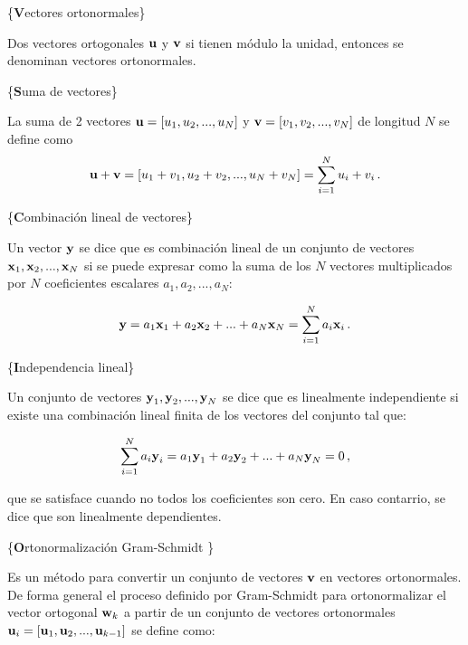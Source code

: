 \documentclass[
]{agujournal2019}
\begin{document}
\vspace{0.5cm}

\{\noindent \textbf Vectores ortonormales\}

Dos vectores ortogonales \({\textbf u}\) y \({\textbf v}\) si tienen
módulo la unidad, entonces se denominan vectores ortonormales.

\vspace{0.5cm} \{\noindent \textbf Suma de vectores\}

La suma de 2 vectores \({\textbf u}=[u_1,u_2,...,u_N]\) y
\({\textbf v}=[v_1,v_2,...,v_N]\) de longitud \(N\) se define como
\[{\textbf u} + {\textbf v}= [u_1 + v_1, u_2 + v_2,..., u_N + v_N]=\sum\limits^N_{i=1} u_i + v_i\,.\]

\vspace{0.5cm} \{\noindent \textbf Combinación lineal de vectores\}

Un vector \({\textbf y}\) se dice que es combinación lineal de un
conjunto de vectores \({\textbf x}_1, {\textbf x}_2, ...,{\textbf x}_N\)
si se puede expresar como la suma de los \(N\) vectores multiplicados
por \(N\) coeficientes escalares \(a_1,a_2,...,a_N\):

\[{\textbf y}=a_1 {\textbf x}_1 + a_2 {\textbf x}_2 +...+a_N {\textbf x}_N=\sum\limits^N_{i=1}a_i {\textbf x}_i\,.\]

\vspace{0.5cm} \{\noindent \textbf Independencia lineal\}

Un conjunto de vectores
\({\textbf y}_1, {\textbf y}_2, ...,{\textbf y}_N\) se dice que es
linealmente independiente si existe una combinación lineal finita de los
vectores del conjunto tal que:

\[\sum\limits^N_{i=1} a_i {\textbf y}_i=a_1{\textbf y}_1 + a_2{\textbf y}_2+...+a_N{\textbf y}_N=0\,,\]

que se satisface cuando no todos los coeficientes son cero. En caso
contarrio, se dice que son linealmente dependientes.

\vspace{0.5cm}

\{\noindent \textbf Ortonormalización Gram-Schmidt \}

Es un método para convertir un conjunto de vectores \({\textbf v}\) en
vectores ortonormales. De forma general el proceso definido por
Gram-Schmidt para ortonormalizar el vector ortogonal \({\textbf w}_k\) a
partir de un conjunto de vectores ortonormales
\({\textbf u}_i=[{\textbf u}_1, {\textbf u}_2,...,{\textbf u}_{k-1}]\)
se define como:
\end{document}
